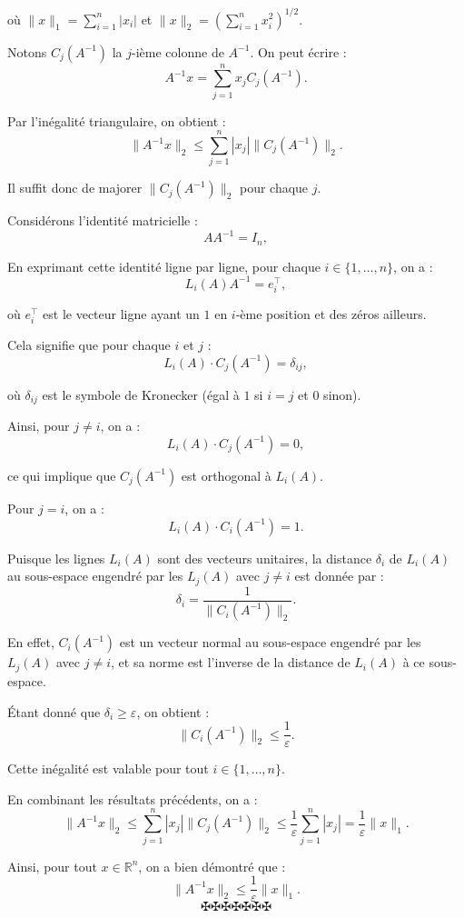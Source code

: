 o{\`u} $\|x\|_1 = \sum_{i = 1}^n |x_i |$ et $\|x\|_2 = \left( \sum_{i = 1}^n
x_i^2 \right)^{1 / 2}$.

Notons $C_j (A^{- 1})$ la $j$-i{\`e}me colonne de $A^{- 1}$. On peut
{\'e}crire :
\[ A^{- 1} x = \sum_{j = 1}^n x_j C_j (A^{- 1}) . \]


Par l'in{\'e}galit{\'e} triangulaire, on obtient :
\[ \|A^{- 1} x\|_2 \leq \sum_{j = 1}^n |x_j |\|C_j (A^{- 1})\|_2 . \]


Il suffit donc de majorer $\|C_j (A^{- 1})\|_2$ pour chaque $j$.

Consid{\'e}rons l'identit{\'e} matricielle :
\[ AA^{- 1} = I_n, \]


En exprimant cette identit{\'e} ligne par ligne, pour chaque $i \in \{1,
\ldots, n\}$, on a :
\[ L_i (A) A^{- 1} = e_i^{\top}, \]


o{\`u} $e_i^{\top}$ est le vecteur ligne ayant un $1$ en $i$-{\`e}me position
et des z{\'e}ros ailleurs.

Cela signifie que pour chaque $i$ et $j$ :
\[ L_i (A) \cdot C_j (A^{- 1}) = \delta_{ij}, \]


o{\`u} $\delta_{ij}$ est le symbole de Kronecker ({\'e}gal {\`a} $1$ si $i =
j$ et $0$ sinon).

Ainsi, pour $j \neq i$, on a :
\[ L_i (A) \cdot C_j (A^{- 1}) = 0, \]


ce qui implique que $C_j (A^{- 1})$ est orthogonal {\`a} $L_i (A)$.

Pour $j = i$, on a :
\[ L_i (A) \cdot C_i (A^{- 1}) = 1. \]


Puisque les lignes $L_i (A)$ sont des vecteurs unitaires, la distance
$\delta_i$ de $L_i (A)$ au sous-espace engendr{\'e} par les $L_j (A)$ avec $j
\neq i$ est donn{\'e}e par :
\[ \delta_i = \frac{1}{\|C_i (A^{- 1})\|_2} . \]


En effet, $C_i (A^{- 1})$ est un vecteur normal au sous-espace engendr{\'e}
par les $L_j (A)$ avec $j \neq i$, et sa norme est l'inverse de la distance de
$L_i (A)$ {\`a} ce sous-espace.

{\'E}tant donn{\'e} que $\delta_i \geq \varepsilon$, on obtient :
\[ \|C_i (A^{- 1})\|_2 \leq \frac{1}{\varepsilon} . \]


Cette in{\'e}galit{\'e} est valable pour tout $i \in \{1, \ldots, n\}$.

En combinant les r{\'e}sultats pr{\'e}c{\'e}dents, on a :
\[ \|A^{- 1} x\|_2 \leq \sum_{j = 1}^n |x_j |\|C_j (A^{- 1})\|_2 \leq
   \frac{1}{\varepsilon}  \sum_{j = 1}^n |x_j | = \frac{1}{\varepsilon}
   \|x\|_1 . \]


Ainsi, pour tout $x \in \mathbb{R}^n$, on a bien d{\'e}montr{\'e} que :
\[ \|A^{- 1} x\|_2 \leq \frac{1}{\varepsilon} \|x\|_1 . \]
\[ \maltese \maltese \maltese \maltese \maltese \maltese \maltese \]
